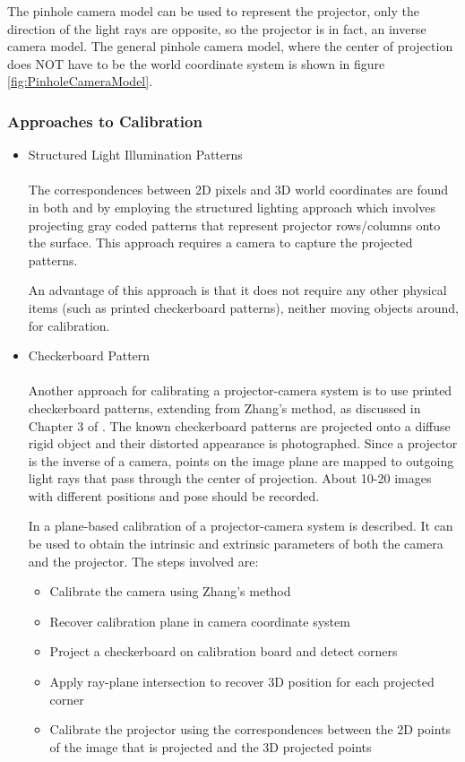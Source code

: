 \documentclass[]{article}
\begin{document}
The pinhole camera model can be used to represent the projector, only the direction of the light rays are opposite, so the projector is in fact, an inverse camera model. The general pinhole camera model, where the center of projection does NOT have to be the world coordinate system is shown in figure \ref{fig:PinholeCameraModel}.

\subsubsection{Approaches to Calibration}

\begin{itemize}
\item Structured Light Illumination Patterns
\\
\\The correspondences between 2D pixels and 3D world coordinates are found in both \cite{radhwan11} and \cite{yamazaki11} by employing the structured lighting approach which involves projecting gray coded patterns that represent projector rows/columns onto the surface. This approach requires a camera to capture the projected patterns.

An advantage of this approach is that it does not require any other physical items (such as printed checkerboard patterns), neither moving objects around, for calibration.\\
\item Checkerboard Pattern\\
\\Another approach for calibrating a projector-camera system is to use printed checkerboard patterns, extending from Zhang's method, as discussed in Chapter 3 of \cite{lanman09}. The known checkerboard patterns are projected onto a diffuse rigid object and their distorted appearance is photographed. Since a projector is the inverse of a camera, points on the image plane are mapped to outgoing light rays that pass through the center of projection. About 10-20 images with different positions and pose should be recorded.

In \cite{falcao08} a plane-based calibration of a projector-camera system is described. It can be used to obtain the intrinsic and extrinsic parameters of both the camera and the projector. The steps involved are:
\begin{itemize}
\item Calibrate the camera using Zhang's method
\item Recover calibration plane in camera coordinate system
\item Project a checkerboard on calibration board and detect corners
\item Apply ray-plane intersection to recover 3D position for each projected corner
\item Calibrate the projector using the correspondences between the 2D points of the image that is projected and the 3D projected points
\end{itemize}



\end{itemize}
\end{document}
